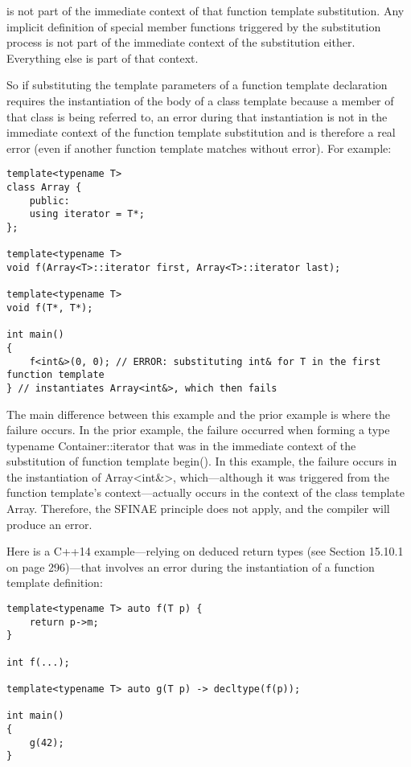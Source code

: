 is not part of the immediate context of that function template substitution. Any implicit definition of special member functions triggered by the substitution process is not part of the immediate context of the substitution either. Everything else is part of that context.

So if substituting the template parameters of a function template declaration requires the instantiation of the body of a class template because a member of that class is being referred to, an error during that instantiation is not in the immediate context of the function template substitution and is therefore a real error (even if another function template matches without error). For example:

\begin{lstlisting}[style=styleCXX]
template<typename T>
class Array {
	public:
	using iterator = T*;
};

template<typename T>
void f(Array<T>::iterator first, Array<T>::iterator last);

template<typename T>
void f(T*, T*);

int main()
{
	f<int&>(0, 0); // ERROR: substituting int& for T in the first function template
} // instantiates Array<int&>, which then fails
\end{lstlisting}

The main difference between this example and the prior example is where the failure occurs. In the prior example, the failure occurred when forming a type typename Container::iterator that was in the immediate context of the substitution of function template begin(). In this example, the failure occurs in the instantiation of Array<int\&>, which—although it was triggered from the function template’s context—actually occurs in the context of the class template Array. Therefore, the SFINAE principle does not apply, and the compiler will produce an error.

Here is a C++14 example—relying on deduced return types (see Section 15.10.1 on page 296)—that involves an error during the instantiation of a function template definition:

\begin{lstlisting}[style=styleCXX]
template<typename T> auto f(T p) {
	return p->m;
}

int f(...);

template<typename T> auto g(T p) -> decltype(f(p));

int main()
{
	g(42);
}
\end{lstlisting}

